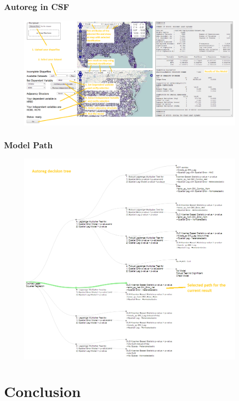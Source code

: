 \documentclass[usepdftitle=false,professionalfonts,compress ]{beamer}
\begin{document}
{
\begin{frame}\frametitle{Autoreg in CSF}

\begin{figure}
	\includegraphics[width=.97\textwidth]{autoreg.png}\end{figure}
\end{frame}
}



{
\begin{frame}\frametitle{Model Path}

\begin{figure}
	\includegraphics[height=.97\textheight]{tree.png}\end{figure}
\end{frame}
}


\section*{Conclusion}
\end{document}
